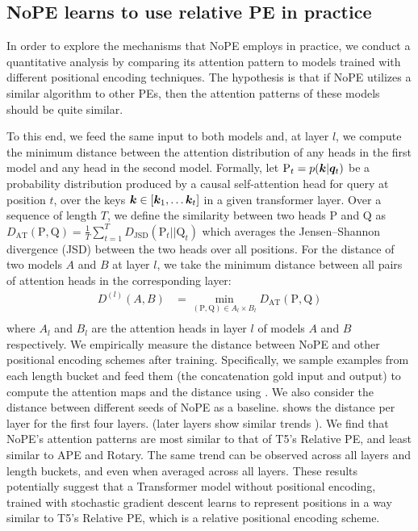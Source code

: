 \documentclass{article}
\begin{document}
\label{sec:nope_mechanism}

\subsection{NoPE learns to use relative PE in practice}
\label{sec:analysis}

In order to explore the mechanisms that NoPE employs in practice, we conduct a quantitative analysis by comparing its attention pattern to models trained with different positional encoding techniques. The hypothesis is that if NoPE utilizes a similar algorithm to other PEs, then the attention patterns of these models should be quite similar.

To this end, we feed the same input to both models and, at layer $l$, we compute the minimum distance between the attention distribution of any heads in the first model and any head in the second model. %
Formally, let
$\mathrm{P}_t = p({\bm{k}}|{\bm{q}}_t)$
be a probability distribution produced by a causal self-attention head for query at position $t$, over the keys ${\bm{k}} \in [{\bm{k}}_1, \dots {\bm{k}}_t]$ in a given transformer layer.
Over a sequence of length $T$, we define the similarity between two heads $\mathrm{P}$ and $\mathrm{Q}$ as $D_\mathrm{AT}(\mathrm{P}, \mathrm{Q}) = \frac{1}{T} \sum_{t=1}^T D_\mathrm{JSD}(\mathrm{P}_t || \mathrm{Q}_t) $
which averages the Jensen–Shannon divergence (JSD) between the two heads over all positions.
For the distance of two models $A$ and $B$ at layer $l$,
we take the minimum distance between all pairs of attention heads in the corresponding layer:
\begin{equation}
  \begin{aligned}
    D^{(l)}(A, B) & = \min_{(\mathrm{P}, \mathrm{Q}) \in A_l \times B_l} D_\mathrm{AT}(\mathrm{P}, \mathrm{Q}) \\
  \end{aligned}
  \label{eq:similarity}
\end{equation}
where $A_l$ and $B_l$ are the attention heads in layer $l$ of models $A$ and $B$ respectively.
We empirically measure the distance between NoPE and other positional encoding schemes after training.
Specifically, we sample examples from each length bucket and feed them (the concatenation gold input and output) to compute the attention maps and the distance using . We also consider the distance between different seeds of NoPE as a baseline.
 shows the distance per layer for the first four layers. (later layers show similar trends ).
We find that NoPE's attention patterns are most similar to that of T5's Relative PE,
and least similar to APE and Rotary. The same trend can be observed across all layers and length buckets, and even when averaged across all layers.
These results potentially suggest that a Transformer model without positional encoding, trained with
stochastic gradient descent learns to represent positions in a way similar to T5's Relative PE, which is a relative positional encoding scheme.
\end{document}
